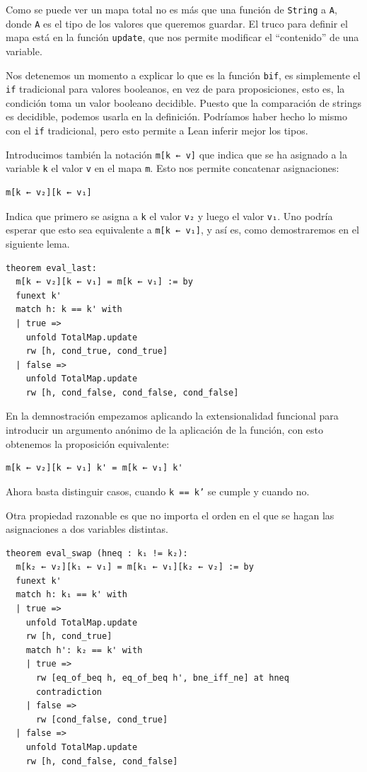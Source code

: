 \documentclass[../main.tex]{subfiles}
\begin{document}
Como se puede ver un mapa total no es más que una función de \texttt{String} a \texttt{A},
donde \texttt{A} es el tipo de los valores que queremos guardar. El truco para
definir el mapa está en la función \texttt{update}, que nos permite modificar
el \enquote{contenido} de una variable.

Nos detenemos un momento a explicar lo que es la función \texttt{bif}, 
es simplemente el \texttt{if} tradicional para valores booleanos, en vez
de para proposiciones, esto es, la condición toma un valor booleano decidible.
Puesto que la comparación de strings es decidible, podemos usarla en la definición.
Podríamos haber hecho lo mismo con el \texttt{if} tradicional, pero esto permite
a Lean inferir mejor los tipos.

Introducimos también la notación \texttt{m[k ← v]} que indica que se ha
asignado a la variable \texttt{k} el valor \texttt{v} en el mapa \texttt{m}.
Esto nos permite concatenar asignaciones:

\begin{verbatim}
m[k ← v₂][k ← v₁]
\end{verbatim}

Indica que primero se asigna a \texttt{k} el valor \texttt{v₂} y luego el valor \texttt{v₁}.
Uno podría esperar que esto sea equivalente a \texttt{m[k ← v₁]}, y así es,
como demostraremos en el siguiente lema.

\begin{verbatim}
theorem eval_last:
  m[k ← v₂][k ← v₁] = m[k ← v₁] := by
  funext k'
  match h: k == k' with
  | true =>
    unfold TotalMap.update
    rw [h, cond_true, cond_true]
  | false =>
    unfold TotalMap.update
    rw [h, cond_false, cond_false, cond_false]
\end{verbatim}

En la demnostración empezamos aplicando la extensionalidad funcional para introducir
un argumento anónimo de la aplicación de la función, con esto obtenemos la
proposición equivalente:

\begin{verbatim}
m[k ← v₂][k ← v₁] k' = m[k ← v₁] k'
\end{verbatim}

Ahora basta distinguir casos, cuando \texttt{k == k'} se cumple y cuando no.

Otra propiedad razonable es que no importa el orden en el que se hagan las asignaciones
a dos variables distintas.

\begin{verbatim}
theorem eval_swap (hneq : k₁ != k₂):
  m[k₂ ← v₂][k₁ ← v₁] = m[k₁ ← v₁][k₂ ← v₂] := by
  funext k'
  match h: k₁ == k' with
  | true =>
    unfold TotalMap.update
    rw [h, cond_true]
    match h': k₂ == k' with
    | true =>
      rw [eq_of_beq h, eq_of_beq h', bne_iff_ne] at hneq
      contradiction
    | false =>
      rw [cond_false, cond_true]
  | false =>
    unfold TotalMap.update
    rw [h, cond_false, cond_false]
\end{verbatim}
\end{document}
